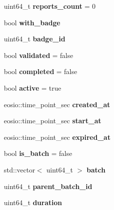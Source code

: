 \begin{DoxyCompactItemize}
uint64\+\_\+t {\bfseries reports\+\_\+count} = 0
\item 
\mbox{\label{structtasks_af9fad58b74a1abaf62159f207886d132}} 
bool {\bfseries with\+\_\+badge}
\item 
\mbox{\label{structtasks_a6f2215e4279786acdf18c2b55c5cd840}} 
uint64\+\_\+t {\bfseries badge\+\_\+id}
\item 
\mbox{\label{structtasks_afe5af40a582c8449c3077190c9cd0a78}} 
bool {\bfseries validated} = false
\item 
\mbox{\label{structtasks_a83e06aea80c059d8c7fac27ec33d65a7}} 
bool {\bfseries completed} = false
\item 
\mbox{\label{structtasks_a0fc8631b0327820af735ded60237a177}} 
bool {\bfseries active} = true
\item 
\mbox{\label{structtasks_ae74d43862baa65c4849a9508dca9fb7e}} 
eosio\+::time\+\_\+point\+\_\+sec {\bfseries created\+\_\+at}
\item 
\mbox{\label{structtasks_a5a306bc121712422d8daf5e9b6002e63}} 
eosio\+::time\+\_\+point\+\_\+sec {\bfseries start\+\_\+at}
\item 
\mbox{\label{structtasks_a3f18f667e301d7d22147dd837b8301ac}} 
eosio\+::time\+\_\+point\+\_\+sec {\bfseries expired\+\_\+at}
\item 
\mbox{\label{structtasks_a4b92b0e447cf09f59b21b1bf4e173a9f}} 
bool {\bfseries is\+\_\+batch} = false
\item 
\mbox{\label{structtasks_a20accf3519f1620e33def9da6d73ba74}} 
std\+::vector$<$ uint64\+\_\+t $>$ {\bfseries batch}
\item 
\mbox{\label{structtasks_a0414fbac42d48d631c985c51d203d8e3}} 
uint64\+\_\+t {\bfseries parent\+\_\+batch\+\_\+id}
\item 
\mbox{\label{structtasks_a95f88b37716d025c81cfcf9091b7b1e9}} 
uint64\+\_\+t {\bfseries duration}

\end{DoxyCompactItemize}

